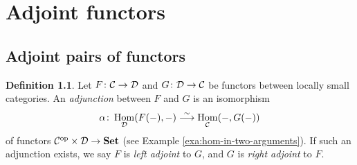 \documentclass[11pt]{amsbook}
\newcommand{\longisomto}{\overset{\sim}{\longrightarrow}}
\DeclareMathOperator\Hom{Hom}
\DeclareMathOperator\Mod{{\bf{Mod}}}
\def\opp{\mathrm{op}}
\def\Set{\mathbf{Set}}
\def\Mod{\mathbf{Mod}}
\theoremstyle{plain}
\theoremstyle{definition}
\newtheorem{definition}[theorem]{Definition}
\newtheorem{exercise}{Exercise}
\begin{document}
%
%
%
%
%
%
%





\chapter{Adjoint functors}\label{chapter:adjoint-functors}

\section{Adjoint pairs of functors}

\begin{definition}
Let $F\colon {\mathcal{C}} \to {\mathcal{D}}$ and $G\colon {\mathcal{D}} \to {\mathcal{C}}$ be functors between locally small categories. An \emph{adjunction} between $F$ and $G$ is an isomorphism 
\[
	\alpha\colon \Hom_\cD( F(-), - ) \longisomto \Hom_\cC( -, G(-) )
\]
of functors $\cC^\opp \times \cD \to \Set$ (see Example \ref{exa:hom-in-two-arguments}). If such an adjunction exists, we say  $F$ is \emph{left adjoint} to $G$, and  $G$ is \emph{right adjoint} to $F$. 
\end{definition}
\end{document}
